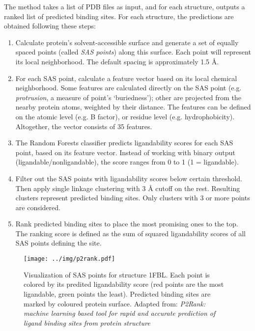 The method takes a list of PDB files as input, and for each structure, outputs a ranked list of predicted binding sites. For each structure, the predictions are obtained following these steps: \cite{p2rank1, p2rank2}

\begin{enumerate}
\item Calculate protein's solvent-accessible surface \cite{shrake} and generate a set of equally spaced points (called \textit{SAS points}) along this surface. Each point will represent its local neighborhood. The default spacing is approximately 1.5 {\AA}. 
\item For each SAS point, calculate a feature vector based on its local chemical neighborhood. Some features are calculated directly on the SAS point (e.g. \textit{protrusion}, a measure of point's `buriedness'); other are projected from the nearby protein atoms, weighted by their distance. The features can be defined on the atomic level (e.g. B factor), or residue level (e.g. hydrophobicity). Altogether, the vector consists of 35 features.
\item The Random Forests classifier predicts ligandability scores for each SAS point, based on its feature vector. Instead of working with binary output (ligandable/nonligandable), the score ranges from 0 to 1 (1 = ligandable).
\item Filter out the SAS points with ligandability scores below certain threshold. Then apply single linkage clustering with 3 {\AA} cutoff on the rest. Resulting clusters represent predicted binding sites. Only clusters with 3 or more points are considered.
\item Rank predicted binding sites to place the most promising ones to the top. The ranking score is defined as the sum of squared ligandability scores of all SAS points defining the site.
\end{enumerate}

\begin{figure}[!h]\centering
\texttt{[image: ../img/p2rank.pdf]}
\caption{Visualization of SAS points for structure 1FBL. Each point is colored by its predited ligandability score (red points are the most ligandable, green points the least). Predicted binding sites are marked by coloured protein surface. Adapted from: \textit{P2Rank: machine learning based tool for rapid and accurate prediction of ligand binding sites from protein structure} \cite{p2rank1}}
\label{fig:p2rank}
\end{figure}

